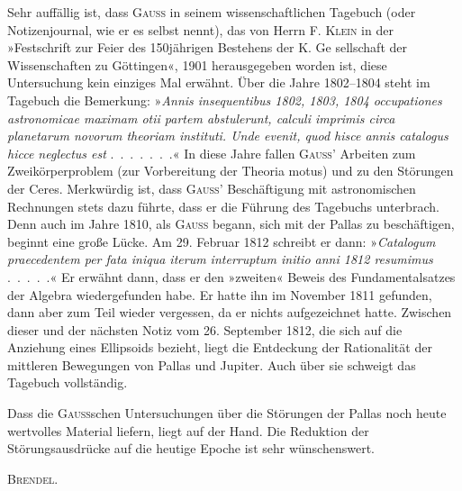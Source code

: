 \par\noindent\hspace*{\parindent}Sehr auffällig ist, dass \textsc{Gauss} in seinem wissenschaftlichen
Tagebuch (oder Notizenjournal, wie er es selbst nennt), das von Herrn
F. \textsc{Klein} in der »Festschrift zur Feier des 150jährigen Bestehens der K. Ge%
sellschaft der Wissenschaften zu Göttingen«, 1901 herausgegeben
worden ist, diese Untersuchung kein einziges Mal erwähnt.
Über die Jahre 1802--1804 steht im Tagebuch die Bemerkung: »\textit{Annis
insequentibus 1802, 1803, 1804 occupationes astronomicae maximam otii partem
abstulerunt, calculi imprimis circa planetarum novorum theoriam instituti.
Unde evenit, quod hisce annis catalogus hicce neglectus est} \mbox{.\ .\ .\ .\ .\ .\ .}«
In diese Jahre fallen \textsc{Gauss}' Arbeiten zum Zweikörperproblem
(zur Vorbereitung der Theoria motus) und zu den Störungen der Ceres. Merkwürdig
ist, dass \textsc{Gauss}' Beschäftigung mit astronomischen Rechnungen
stets dazu führte, dass er die Führung des Tagebuchs unterbrach. Denn auch
im Jahre 1810, als \textsc{Gauss} begann, sich mit der Pallas zu beschäftigen,
beginnt eine große Lücke. Am 29. Februar 1812 schreibt er dann: »\textit{Catalogum
praecedentem per fata iniqua iterum interruptum initio anni 1812 resumimus}
\mbox{.\ .\ .\ .\ .}« Er erwähnt dann, dass er den »zweiten« Beweis
des Fundamentalsatzes der Algebra wiedergefunden habe. Er hatte ihn im November 1811 gefunden,
dann aber zum Teil wieder vergessen, da er nichts
aufgezeichnet hatte. Zwischen dieser und der nächsten Notiz vom 26. September
1812, die sich auf die Anziehung eines Ellipsoids bezieht, liegt die
Entdeckung der Rationalität der mittleren Bewegungen von Pallas und Jupiter.
Auch über sie schweigt das Tagebuch vollständig.

\par\noindent\hspace*{\parindent}Dass die \textsc{Gauss}schen Untersuchungen über die Störungen der Pallas
noch heute wertvolles Material liefern, liegt auf der Hand. Die Reduktion
der Störungsausdrücke auf die heutige Epoche ist
sehr wünschenswert.
\par\nobreak\noindent\hfill\textsc{Brendel}.\par
\nobreak\vspace{3pt}\noindent\makebox[\linewidth]{\rule{.24\linewidth}{.4pt}}\par
\clearpage
\endgroup
